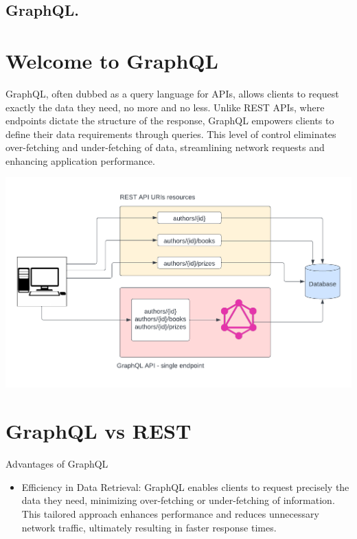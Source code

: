 \documentclass[a4paper,12pt]{article}
\begin{document}


\begin{large}

\begin{center}
\section*{GraphQL.}
\end{center}

\medskip

\section{Welcome to GraphQL}

GraphQL, often dubbed as a query language for APIs, allows clients to request exactly the data they need, no more and no less. Unlike REST APIs, where endpoints dictate the structure of the response, GraphQL empowers clients to define their data requirements through queries. This level of control eliminates over-fetching and under-fetching of data, streamlining network requests and enhancing application performance.

\includegraphics[scale=0.8]{gq1}

\section{GraphQL vs REST}

Advantages of GraphQL

\begin{itemize}
\item Efficiency in Data Retrieval: GraphQL enables clients to request precisely the data they need, minimizing over-fetching or under-fetching of information. This tailored approach enhances performance and reduces unnecessary network traffic, ultimately resulting in faster response times.


\end{itemize}
\end{large}
\end{document}
